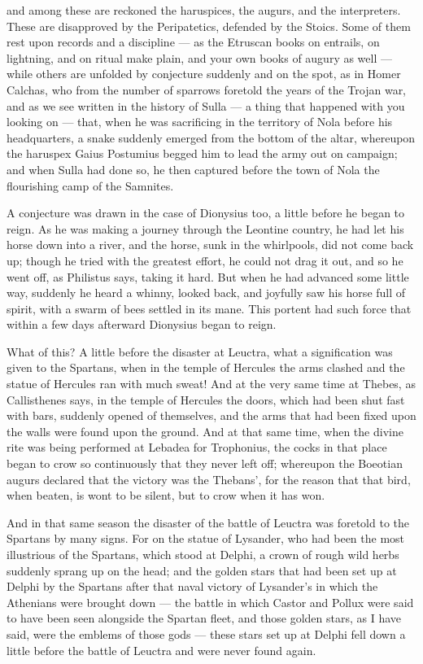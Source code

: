  and among these are reckoned the haruspices, the augurs, and the interpreters. These are disapproved by the Peripatetics, defended by the Stoics. Some of them rest upon records and a discipline — as the Etruscan books on entrails, on lightning, and on ritual make plain, and your own books of augury as well — while others are unfolded by conjecture suddenly and on the spot, as in Homer Calchas, who from the number of sparrows foretold the years of the Trojan war, and as we see written in the history of Sulla — a thing that happened with you looking on — that, when he was sacrificing in the territory of Nola before his headquarters, a snake suddenly emerged from the bottom of the altar, whereupon the haruspex Gaius Postumius begged him to lead the army out on campaign; and when Sulla had done so, he then captured before the town of Nola the flourishing camp of the Samnites.

 A conjecture was drawn in the case of Dionysius too, a little before he began to reign. As he was making a journey through the Leontine country, he had let his horse down into a river, and the horse, sunk in the whirlpools, did not come back up; though he tried with the greatest effort, he could not drag it out, and so he went off, as Philistus says, taking it hard. But when he had advanced some little way, suddenly he heard a whinny, looked back, and joyfully saw his horse full of spirit, with a swarm of bees settled in its mane. This portent had such force that within a few days afterward Dionysius began to reign.

 What of this? A little before the disaster at Leuctra, what a signification was given to the Spartans, when in the temple of Hercules the arms clashed and the statue of Hercules ran with much sweat! And at the very same time at Thebes, as Callisthenes says, in the temple of Hercules the doors, which had been shut fast with bars, suddenly opened of themselves, and the arms that had been fixed upon the walls were found upon the ground. And at that same time, when the divine rite was being performed at Lebadea for Trophonius, the cocks in that place began to crow so continuously that they never left off; whereupon the Boeotian augurs declared that the victory was the Thebans', for the reason that that bird, when beaten, is wont to be silent, but to crow when it has won.

 And in that same season the disaster of the battle of Leuctra was foretold to the Spartans by many signs. For on the statue of Lysander, who had been the most illustrious of the Spartans, which stood at Delphi, a crown of rough wild herbs suddenly sprang up on the head; and the golden stars that had been set up at Delphi by the Spartans after that naval victory of Lysander's in which the Athenians were brought down — the battle in which Castor and Pollux were said to have been seen alongside the Spartan fleet, and those golden stars, as I have said, were the emblems of those gods — these stars set up at Delphi fell down a little before the battle of Leuctra and were never found again.

